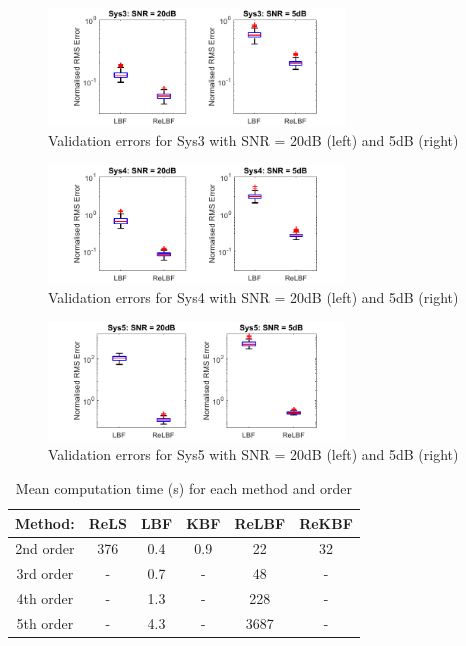 \begin{figure}[!h]
\centering
\includegraphics[width = 0.7\textwidth]{Chapter5_RegBFs/Georgios_3rdOrder.pdf}
\caption{Validation errors for Sys3 with SNR = 20dB (left) and 5dB (right)}
\label{Sys3_Val}
\end{figure}
\begin{figure}[!h]
\centering
\includegraphics[width = 0.7\textwidth]{Chapter5_RegBFs/Georgios_4thOrder.pdf}
\caption{Validation errors for Sys4 with SNR = 20dB (left) and 5dB (right)}
\label{Sys4_Val}
\end{figure}
\begin{figure}[!h]
\centering
\includegraphics[width = 0.7\textwidth]{Chapter5_RegBFs/Georgios_5thOrder.pdf}
\caption{Validation errors for Sys5 with SNR = 20dB (left) and 5dB (right)}
\label{Sys5_Val}
\end{figure}
\begin{table}[!h]
\centering
\caption{Mean computation time (s) for each method and order}
\label{tab:MeanCompTimes_OBFs}
\begin{tabular}{c||ccccc}
\multicolumn{1}{r}{Method:}                                              & ReLS & LBF & KBF & ReLBF & ReKBF \\ \hline \hline
2nd order	& 376 & 0.4 & 0.9 & 22  & 32 \\
3rd order &-&0.7&-&48&- \\
4th order	&-&1.3&-&228&- \\
5th order	&-&4.3&-&3687&- \\
\end{tabular}
\end{table}

